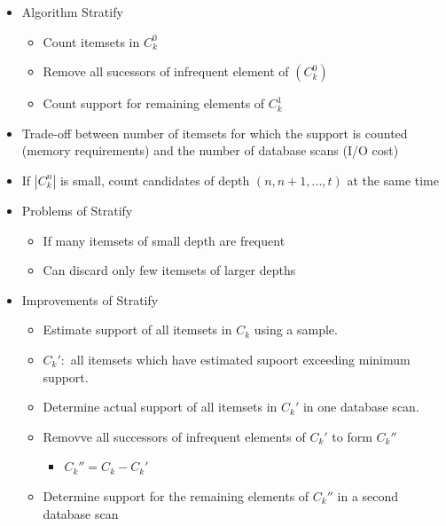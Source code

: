 \documentclass{article}
\begin{document}
\begin{itemize}
  \newpage

  \item Algorithm Stratify
  \begin{itemize}
    \item Count itemsets in $C_k^0$
    \item Remove all sucessors of infrequent element of $(C_k^0)$
    \item Count support for remaining elements of $C_k^1$
  \end{itemize}
  \item Trade-off between number of itemsets for which the support is counted (memory requirements) and the number of database scans (I/O cost)
  \item If $|C_k^n|$ is small, count candidates of depth $(n, n+1, ..., t)$ at the same time

  \item Problems of Stratify
  \begin{itemize}
    \item If many itemsets of small depth are frequent
    \item Can discard only few itemsets of larger depths
  \end{itemize}

  \item Improvements of Stratify
  \begin{itemize}
    \item Estimate support of all itemsets in $C_k$ using a sample.
    \item $C_k':$ all itemsets which have estimated supoort exceeding minimum support.
    \item Determine actual support of all itemsets in $C_k'$ in one database scan.
    \item Removve all successors of infrequent elements of $C_k'$ to form $C_k''$
    \begin{itemize} 
      \item $C_k'' = C_k - C_k'$
    \end{itemize}
    \item Determine support for the remaining elements of $C_k''$ in a second database scan
  \end{itemize}
\end{itemize}
\end{document}
